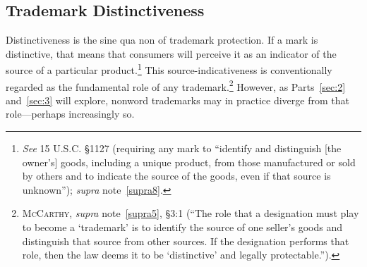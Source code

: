 \documentclass[letterpaper, 11pt, oneside]{article}
\begin{document}
\subsection{Trademark Distinctiveness} \label{subsec:1B}

Distinctiveness is the sine qua non of trademark protection. If a mark is distinctive, that means that consumers will perceive it as an indicator of the source of a particular product.\footnote{\textit{See} 15 U.S.C. \S 1127 (requiring any mark to ``identify and distinguish [the owner's] goods, including a unique product, from those manufactured or sold by others and to indicate the source of the goods, even if that source is unknown''); \textit{supra} note~\ref{supra8}.} This source-indicativeness is conventionally regarded as the fundamental role of any trademark.\footnote{\textsc{McCarthy}, \textit{supra} note~\ref{supra5}, \S 3:1 (``The role that a designation must play to become a `trademark' is to identify the source of one seller's goods and distinguish that source from other sources. If the designation performs that role, then the law deems it to be `distinctive' and legally protectable.'').} However, as Parts~\ref{sec:2} and~\ref{sec:3} will explore, nonword trademarks may in practice diverge from that role—perhaps increasingly so.
\end{document}
